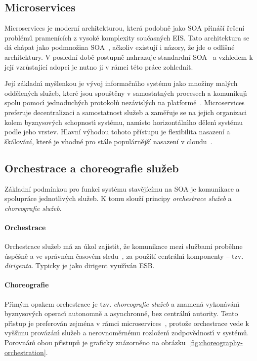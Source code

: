 \subsection{Microservices}\label{sec:microservices}

Microservices je moderní architekturou, která podobně jako \gls{SOA} přináší řešení
problémů pramenících z vysoké komplexity současných \gls{EIS}.
Tato architektura se dá chápat jako podmnožina \gls{SOA}~\cite{richards2015microservices, cerny2017disambiguation},
ačkoliv existují i názory, že jde o odlišné architektury. V poslední době postupně nahrazuje standardní
\gls{SOA}~\cite{lewis2014microservices, xiao2016reflections} a vzhledem k její vzrůstající
adopci je nutno ji v rámci této práce zohlednit.

Její základn\'{\i} myšlenkou je v\'yvoj informačn\'{\i}ho systému jako množiny mal\'ych oddělen\'ych služeb,
které jsou spouštěny v samostatn\'ych procesech a komunikuj\'{\i} spolu pomoc\'{\i} jednoduch\'ych
protokolů nezávislých na platformě~\cite{lewis2014microservices}. Microservices preferuje decentralizaci a samostatnost služeb
a zaměřuje se na jejich organizaci kolem byznysov\'ych schopnost\'{\i} systému, nam\'{\i}sto horizontáln\'{\i}ho
dělen\'{\i} systému podle jeho vrstev. Hlavní výhodou tohoto přístupu je flexibilita nasazení a škálování, které je vhodné
pro stále populárnější nasazení v cloudu~\cite{kratzke2017understanding, cerny2018contextual, xiao2016reflections}.

\subsection{Orchestrace a choreografie služeb}

Základní podmínkou pro funkci systému stavějícímu na \gls{SOA} je komunikace a spolupráce jednotlivých služeb.
K tomu slouží principy \textit{orchestrace služeb} a \textit{choreografie služeb}.

\paragraph{Orchestrace}
Orchestrace služeb má za úkol zajistit, že komunikace mezi službami
proběhne úspěšně a ve správném časovém sledu~\cite{orchestration},
za použití centráln\'{\i} komponenty -- tzv. \textit{dirigenta}.
Typicky je jako dirigent využ\'{\i}ván \gls{ESB}.

\paragraph{Choreografie}
Př\'{\i}m\'ym opakem orchestrace je tzv. \textit{choreografie služeb} a znamená
vykonáván\'{\i} byznysov\'ych operac\'{\i} autonomně a asynchronně, bez centráln\'{\i}
autority. Tento př\'{\i}stup je preferován zejména v rámci microservices~\cite{dragoni2017microservices},
protože orchestrace vede k vyšš\'{\i}mu provázán\'{\i} služeb a nerovnoměrnému rozložen\'{\i}
zodpovědnost\'{\i} v systémů. Porovnán\'{\i} obou př\'{\i}stupů je graficky
znázorněno na obrázku~\ref{fig:choreography-orchestration}.


